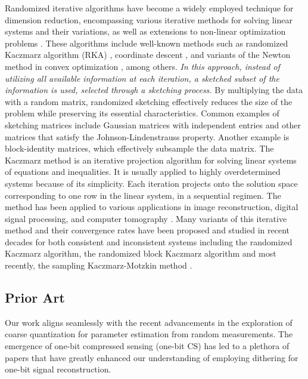 \documentclass[12pt,draftcls,onecolumn]{IEEEtran}
\begin{document}
Randomized iterative algorithms have become a widely employed technique for dimension reduction, encompassing various iterative methods for solving linear systems and their variations, as well as extensions to non-linear optimization problems \cite{martinsson2020randomized}. These algorithms include well-known methods such as randomized Kaczmarz algorithm (RKA) \cite{strohmer2009randomized,dai2013randomized}, coordinate descent \cite{leventhal2010randomized, ma2015convergence}, and variants of the Newton method in convex optimization \cite{yuan2022sketched}, among others.
\emph{In this approach, instead of utilizing all available information at each iteration, a sketched subset of the information is used, selected through a sketching process.} By multiplying the data with a random matrix, randomized sketching effectively reduces the size of the problem while preserving its essential characteristics.
Common examples of sketching matrices include Gaussian matrices with independent entries and other matrices that satisfy the Johnson-Lindenstrauss property. Another example is block-identity matrices, which effectively subsample the data matrix.
The Kaczmarz method \cite{kaczmarz1937angenaherte} is an iterative projection algorithm for solving linear systems of equations and inequalities. It is usually applied to highly overdetermined systems because of its simplicity.
Each iteration projects onto the solution space corresponding to one row in the linear system, in a sequential regimen. The method has been applied to various applications in image reconstruction, digital signal processing, and
computer tomography \cite{feichtinger1995kaczmarz,sezan1987applications,eamaz2022phase}. Many variants of this iterative method and their convergence rates have been proposed and studied in recent decades for both consistent and inconsistent systems including the randomized Kaczmarz algorithm, the randomized block Kaczmarz algorithm and most recently, the sampling Kaczmarz-Motzkin method \cite{strohmer2009randomized,leventhal2010randomized,needell2014paved,briskman2015block,de2017sampling}.

\subsection{Prior Art}
Our work aligns seamlessly with the recent advancements in the exploration of coarse quantization for parameter estimation from random measurements. The emergence of one-bit compressed sensing (one-bit CS) has led to a plethora of papers that have greatly enhanced our understanding of employing dithering for one-bit signal reconstruction.
\end{document}
